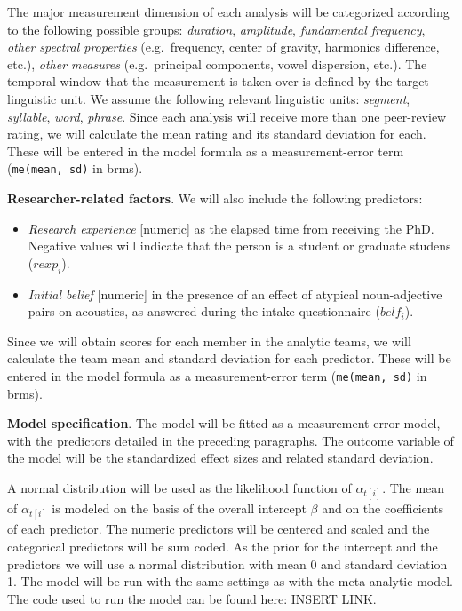 \documentclass[
  12pt,
]{article}
\providecommand{\tightlist}{%
  \setlength{\itemsep}{0pt}\setlength{\parskip}{0pt}}
\begin{document}
The major measurement dimension of each analysis will be categorized according to the following possible groups: \emph{duration}, \emph{amplitude}, \emph{fundamental frequency}, \emph{other spectral properties} (e.g.~frequency, center of gravity, harmonics difference, etc.), \emph{other measures} (e.g.~principal components, vowel dispersion, etc.).
The temporal window that the measurement is taken over is defined by the target linguistic unit.
We assume the following relevant linguistic units: \emph{segment}, \emph{syllable}, \emph{word}, \emph{phrase}.
Since each analysis will receive more than one peer-review rating, we will calculate the mean rating and its standard deviation for each.
These will be entered in the model formula as a measurement-error term (\texttt{me(mean,\ sd)} in brms).

\textbf{Researcher-related factors}. We will also include the following predictors:

\begin{itemize}
\tightlist
\item
  \emph{Research experience} {[}numeric{]} as the elapsed time from receiving the PhD. Negative values will indicate that the person is a student or graduate studens (\(rexp_i\)).
\item
  \emph{Initial belief} {[}numeric{]} in the presence of an effect of atypical noun-adjective pairs on acoustics, as answered during the intake questionnaire (\(belf_i\)).
\end{itemize}

Since we will obtain scores for each member in the analytic teams, we will calculate the team mean and standard deviation for each predictor.
These will be entered in the model formula as a measurement-error term (\texttt{me(mean,\ sd)} in brms).

\textbf{Model specification}. The model will be fitted as a measurement-error model, with the predictors detailed in the preceding paragraphs.
The outcome variable of the model will be the standardized effect sizes and related standard deviation.

A normal distribution will be used as the likelihood function of \(\alpha_{t[i]}\).
The mean of \(\alpha_{t[i]}\) is modeled on the basis of the overall intercept \(\beta\) and on the coefficients of each predictor.
The numeric predictors will be centered and scaled and the categorical predictors will be sum coded.
As the prior for the intercept and the predictors we will use a normal distribution with mean 0 and standard deviation 1.
The model will be run with the same settings as with the meta-analytic model.
The code used to run the model can be found here: INSERT LINK.
\end{document}
